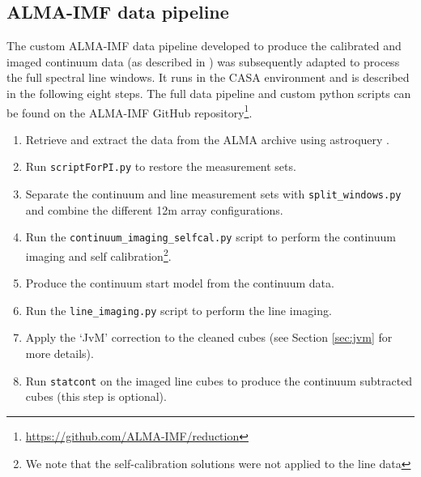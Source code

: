 \documentclass[longauth]{aa} %
\newcommand\statcont{\texttt{statcont}\xspace}
\newcommand{\ag}{\textcolor{red}} %
\begin{document}
\subsection{ALMA-IMF data pipeline\label{sec:almaimfpipeline}}
The custom ALMA-IMF data pipeline developed to produce the calibrated and imaged continuum data (as described in \citealt{Ginsburg2022}) was subsequently adapted to process the full spectral line windows. It runs in the CASA \citep{McMullin2007} environment and is described in the following eight steps. The full data pipeline and custom python scripts can be found on the ALMA-IMF GitHub repository\footnote{\url{https://github.com/ALMA-IMF/reduction}\label{github}}.
\begin{enumerate}
    \item Retrieve and extract the data from the ALMA archive using astroquery \citep{Ginsburg2019b}.
    \item Run \texttt{scriptForPI.py} to restore the measurement sets.
    \item Separate the continuum and line measurement sets with \texttt{split\_windows.py} and combine the different 12m array configurations.
    \item Run the \texttt{continuum\_imaging\_selfcal.py} script to perform the continuum imaging and self calibration\footnote{We note that the self-calibration solutions were not applied to the line data}.
    \item Produce the continuum start model from the continuum data.
    \item Run the \texttt{line\_imaging.py} script to perform the line imaging.
    \item Apply the `JvM' correction \citep{Jorsater1995} to the cleaned cubes (see Section \ref{sec:jvm} for more details).
    \item Run \statcont \citep{statcont2017} on the imaged line cubes to produce the continuum subtracted cubes (this step is optional).
\end{enumerate}
\end{document}
